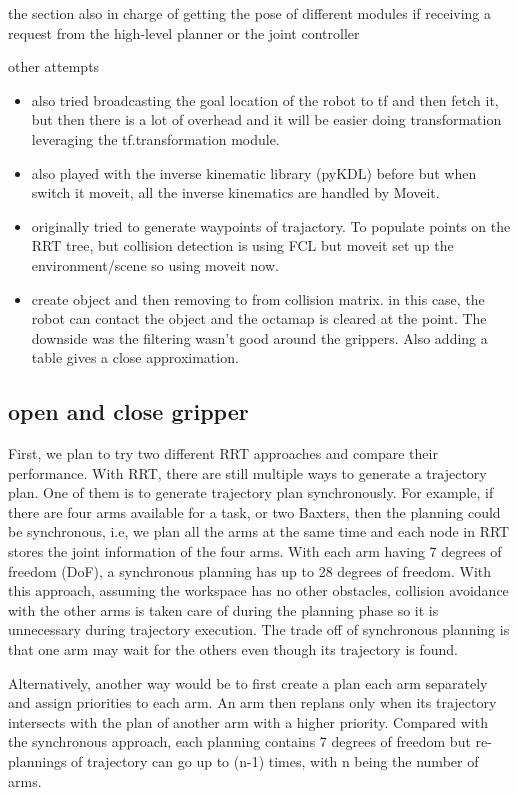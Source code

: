 the section also in charge of getting the pose of different modules if receiving a request from the high-level planner or the joint controller

other attempts
\begin{itemize}
\item also tried broadcasting the goal location of the robot to tf and then fetch it, but then there is a lot of overhead and it will be easier doing transformation leveraging the tf.transformation module.
\item also played with the inverse kinematic library (pyKDL) before but when switch it moveit, all the inverse kinematics are handled by Moveit.
\item originally tried to generate waypoints of trajactory. To populate points on the RRT tree, but collision detection is using FCL but moveit set up the environment/scene so using moveit now.
\item create object and then removing to from collision matrix. in this case, the robot can contact the object and the octamap is cleared at the point. The downside was the filtering wasn't good around the grippers. Also adding a table gives a close approximation. 
\end{itemize}

\subsection{open and close gripper}



First, we plan to try two different RRT approaches and compare their performance. With RRT, there are still multiple ways to generate a trajectory plan.
One of them is to generate trajectory plan synchronously.
For example, if there are four arms available for a task, or two Baxters, then the planning could be synchronous, i.e, we plan all the arms at the same time and each node in RRT stores the joint information of the four arms. With each arm having 7 degrees of freedom (DoF), a synchronous planning has up to 28 degrees of freedom.
With this approach, assuming the workspace has no other obstacles, collision avoidance with the other arms is taken care of during the planning phase so it is unnecessary during trajectory execution.  
The trade off of synchronous planning is that one arm may wait for the others even though its trajectory is found.

Alternatively, another way would be to first create a plan each arm separately and assign priorities to each arm. An arm then replans only when its trajectory intersects with the plan of another arm with a higher priority. Compared with the synchronous approach, each planning contains 7 degrees of freedom but re-plannings of trajectory can go up to (n-1) times, with n being the number of arms. 

